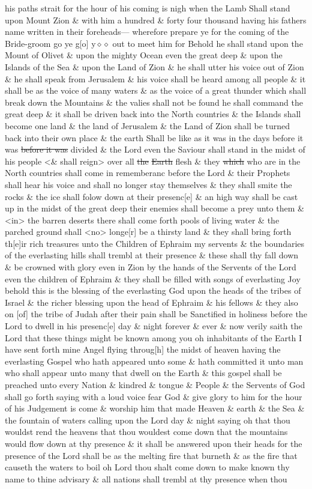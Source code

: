 {his paths strait for the hour of his coming is nigh when the Lamb Shall stand upon Mount Zion \& with him a hundred \& forty four thousand having his fathers name written in their foreheads--- wherefore prepare ye for the coming of the Bride-groom go ye g[o] y$\diamond\diamond$ out to meet him for Behold he shall stand upon the Mount of Olivet \& upon the mighty Ocean even the great deep \& upon the Islands of the Sea \& upon the Land of Zion \& he shall utter his voice out of Zion \& he shall speak from Jerusalem \& his voice shall be heard among all people \& it shall be as the voice of many waters \& as the voice of a great thunder which shall break down the Mountains \& the valies shall not be found he shall command the great deep \& it shall be driven back into the North countries \& the Islands shall become one land \& the land of Jerusalem \& the Land of Zion shall be turned back into their own place \& the earth Shall be like as it was in the days before it was \sout{before it was} divided \& the Lord even the Saviour shall stand in the midst of his people <\& shall reign> over all \sout{the} \sout{Earth} flesh \& they \sout{which} who are in the North countries shall come in rememberanc before the Lord \& their Prophets shall hear his voice and shall no longer stay themselves \& they shall smite the rocks \& the ice shall folow down at their presenc[e] \& an high way shall be cast up in the midst of the great deep their enemies shall become a prey unto them \& <in> the barren deserts there shall come forth pools of living water \& the parched ground shall <no> longe[r] be a thirsty land \& they shall bring forth th[e]ir rich treasures unto the Children of Ephraim my servents \& the boundaries of the everlasting hills shall trembl at their presence \& these shall thy fall down \& be crowned with glory even in Zion by the hands of the Servents of the Lord even the children of Ephraim \& they shall be filled with songs of everlasting Joy behold this is the blessing of the everlasting God upon the heads of the tribes of Israel \& the richer blessing upon the head of Ephraim \& his fellows \& they also on [of] the tribe of Judah after their pain shall be Sanctified in holiness before the Lord to dwell in his presenc[e] day \& night forever \& ever \& now verily saith the Lord that these things might be known among you oh inhabitants of the Earth I have sent forth mine Angel flying throug[h] the midst of heaven having the everlasting Gospel who hath appeared unto some \& hath committed it unto man who shall appear unto many that dwell on the Earth \& this gospel shall be preached unto every Nation \& kindred \& tongue \& People \& the Servents of God shall go forth saying with a loud voice fear God \& give glory to him for the hour of his Judgement is come \& worship him that made Heaven \& earth \& the Sea \& the fountain of waters calling upon the Lord day \& night saying oh that thou wouldst rend the heavens that thou wouldest come down that the mountains would flow down at thy presence \& it shall be answered upon their heads for the presence of the Lord shall be as the melting fire that burneth \& as the fire that causeth the waters to boil oh Lord thou shalt come down to make known thy name to thine advisary \& all nations shall trembl at thy presence when thou }
